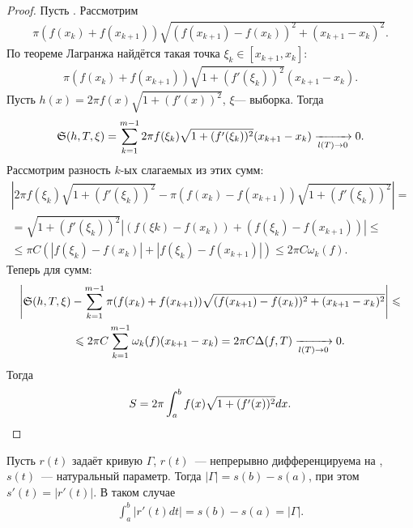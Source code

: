 \documentclass[../main.tex]{subfiles}
\begin{document}
\begin{proof}
    Пусть \tpab. Рассмотрим 
    \begin{gather} 
      \pi (f(x_k)+f(x_{k+1})) \sqrt{(f(x_{k+1}) - f(x_k))^2 + (x_{k+1} - x_k)^2}.
    \end{gather}
    По теореме Лагранжа найдётся такая точка $\xi_k \in [x_{k+1},x_{k}]$: 
    \begin{gather} 
      \pi (f(x_k)+f(x_{k+1})) \sqrt{1+(f'(\xi_k))^2} (x_{k+1}-x_{k}).
    \end{gather}
    Пусть $h(x) = 2\pi f(x) \sqrt{1+(f'(x))^2}$, $\xi$--- выборка. Тогда 
    \begin{gather} 
      \mathfrak{S}(h, T, \xi) = \sum_{k=1}^{m-1} 2\pi f(\xi_k) \sqrt{1+(f'(\xi_k))^2} (x_{k+1}-x_{k})  \xrightarrow[l(T) \to  0 ]{} 0 .
    \end{gather}
    Рассмотрим разность $k$-ых слагаемых из этих сумм: 
    \begin{gather} 
      \left| 2 \pi f(\xi_k) \sqrt{1+(f'(\xi_k))^2} - \pi (f(x_k) - f(x_{k+1})) \sqrt{1+(f'(\xi_k))^2}  \right| = \\ = \sqrt{1+(f'(\xi_k))^2} \left| (f(\xi k) - f(x_k)) + (f(\xi_k) - f(x_{k+1})) \right| \leq \\ \leq \pi C\left( \left| f(\xi_k) - f(x_k) \right|  + \left| f(\xi_k) - f(x_{k+1}) \right| \right) \leq 2\pi C \omega_k (f).
    \end{gather}
    Теперь для сумм: 
    \begin{gather} 
      \left| \mathfrak{S}(h, T, \xi) - \sum_{k=1}^{m-1} \pi (f(x_k)+f(x_{k+1})) \sqrt{(f(x_{k+1}) - f(x_k))^2 + (x_{k+1} - x_k)^2}\right| \leqslant \\ \leqslant 2\pi C \sum_{k=1}^{m-1} \omega_k (f) (x_{k+1}-x_{k}) = 2\pi C \Delta(f, T)  \xrightarrow[l(T) \to  0 ]{} 0   .
    \end{gather}
    Тогда 
    \begin{gather} 
      S = 2\pi \int_a^b f(x) \sqrt{1+(f'(x))^2} dx .
    \end{gather}
\end{proof}

Пусть $r(t)$ задаёт кривую $\Gamma$, $r(t)$~--- непрерывно дифференцируема на \segab, $s(t)$~--- натуральный параметр. Тогда $ \left| \Gamma \right| = s(b) - s(a)$, при этом $s'(t) = \left| r'(t) \right| $. В таком случае 
\begin{gather} 
  \int_{a}^{b} \left| r'(t) dt \right| = s(b) - s(a) = \left| \Gamma \right|  .
\end{gather}
\end{document}
